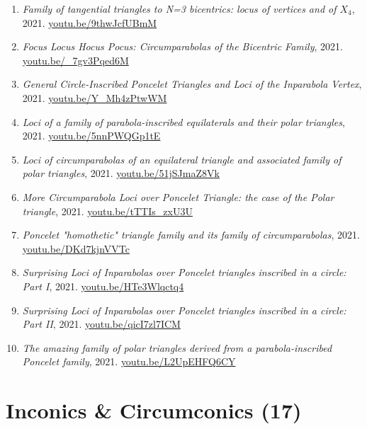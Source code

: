 \documentclass[12pt]{article}
\begin{document}
\begin{enumerate}[resume]
\item \textit{Family of tangential triangles to N=3 bicentrics: locus of vertices and of $X_{4}$}, 2021. \href{https://youtu.be/9thwJcfUBmM}{\url{youtu.be/9thwJcfUBmM}}
\item \textit{Focus Locus Hocus Pocus: Circumparabolas of the Bicentric Family}, 2021. \href{https://youtu.be/_7gv3Pqed6M}{\url{youtu.be/\_7gv3Pqed6M}}
\item \textit{General Circle-Inscribed Poncelet Triangles and Loci of the Inparabola Vertex}, 2021. \href{https://youtu.be/Y_Mh4zPtwWM}{\url{youtu.be/Y\_Mh4zPtwWM}}
\item \textit{Loci of a family of parabola-inscribed equilaterals and their polar triangles}, 2021. \href{https://youtu.be/5nnPWQGp1tE}{\url{youtu.be/5nnPWQGp1tE}}
\item \textit{Loci of circumparabolas of an equilateral triangle and associated family of polar triangles}, 2021. \href{https://youtu.be/51jSJmaZ8Vk}{\url{youtu.be/51jSJmaZ8Vk}}
\item \textit{More Circumparabola Loci over Poncelet Triangle: the case of the Polar triangle}, 2021. \href{https://youtu.be/tTTIs_zxU3U}{\url{youtu.be/tTTIs\_zxU3U}}
\item \textit{Poncelet "homothetic" triangle family and its family of circumparabolas}, 2021. \href{https://youtu.be/DKd7kjnVVTc}{\url{youtu.be/DKd7kjnVVTc}}
\item \textit{Surprising Loci of Inparabolas over Poncelet triangles inscribed in a circle: Part I}, 2021. \href{https://youtu.be/HTe3Wlqctq4}{\url{youtu.be/HTe3Wlqctq4}}
\item \textit{Surprising Loci of Inparabolas over Poncelet triangles inscribed in a circle: Part II}, 2021. \href{https://youtu.be/qicI7zl7ICM}{\url{youtu.be/qicI7zl7ICM}}
\item \textit{The amazing family of polar triangles derived from a parabola-inscribed Poncelet family}, 2021. \href{https://youtu.be/L2UpEHFQ6CY}{\url{youtu.be/L2UpEHFQ6CY}}
\end{enumerate}

\section{Inconics \& Circumconics (17)}
\end{document}
